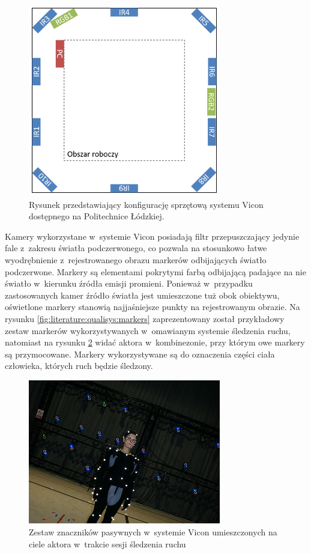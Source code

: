 \begin{figure}[!htp]
	\centering	
	\includegraphics[width=0.75\textwidth]{images/viconSetup.png}
	\caption{Rysunek przedstawiający konfigurację sprzętową systemu Vicon dostępnego na Politechnice Łódzkiej.}
		\label{fig:literature:vicon:lutSetup}
\end{figure}

Kamery wykorzystane w~systemie Vicon posiadają filtr przepuszczający jedynie fale z~zakresu światła podczerwonego, co pozwala na stosunkowo łatwe wyodrębnienie z~rejestrowanego obrazu markerów odbijających światło podczerwone. Markery są elementami pokrytymi farbą odbijającą padające na nie światło w~kierunku źródła emisji promieni. Ponieważ w~przypadku zastosowanych kamer źródło światła jest umieszczone tuż obok obiektywu, oświetlone markery stanowią najjaśniejsze punkty na rejestrowanym obrazie. Na rysunku \ref{fig:literature:qualisys:markers} zaprezentowany został przykładowy zestaw markerów wykorzystywanych w~omawianym systemie śledzenia ruchu, natomiast na rysunku \ref{fig:literature:vicon:markers} widać aktora w~kombinezonie, przy którym owe markery są przymocowane. Markery wykorzystywane są do oznaczenia części ciała człowieka, których ruch będzie śledzony.

\begin{figure}[!htp]
	\centering	
	\includegraphics[width=0.75\textwidth]{images/markers-suits-600x450.png}
	\caption{Zestaw znaczników pasywnych w~systemie Vicon umieszczonych na ciele aktora w~trakcie sesji śledzenia ruchu \cite{ViconMarkersSet}}
		\label{fig:literature:vicon:markers}
\end{figure}

